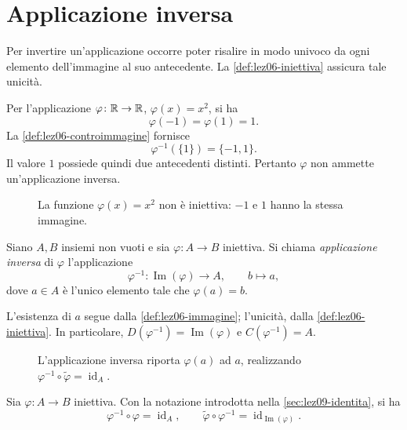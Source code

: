 \section{Applicazione inversa}
\label{sec:lez09-inversa}

Per invertire un'applicazione occorre poter risalire
in modo univoco da ogni elemento dell'immagine al suo
antecedente. La \cref{def:lez06-iniettiva} assicura tale unicità.

\begin{example}
\label{ex:lez09-non-iniettiva-inversa}
Per l'applicazione
\(\varphi\colon\mathbb{R}\to\mathbb{R}\), \(\varphi(x)=x^2\), si ha
\[
  \varphi(-1)=\varphi(1)=1.
\]
La \cref{def:lez06-controimmagine} fornisce
\[
  \varphi^{-1}(\{1\})=\{-1,1\}.
\]
Il valore \(1\) possiede quindi due antecedenti distinti.
Pertanto \(\varphi\) non ammette un'applicazione inversa.
\end{example}

\begin{figure}[htbp]
  \centering
  
  \caption{La funzione \(\varphi(x)=x^2\) non è iniettiva:
  \(-1\) e \(1\) hanno la stessa immagine.}
  \label{fig:lez09-inversa-non-iniettiva}
\end{figure}

\begin{definition}
\label{def:lez09-inversa}
Siano \(A,B\) insiemi non vuoti e sia
\(\varphi\colon A\longrightarrow B\) iniettiva.
Si chiama \emph{applicazione inversa} di \(\varphi\)
l'applicazione
\[
  \varphi^{-1}\colon\operatorname{Im}(\varphi)
  \longrightarrow A,
  \qquad b\longmapsto a,
\]
dove \(a\in A\) è l'unico elemento tale che
\(\varphi(a)=b\).
\end{definition}

L'esistenza di \(a\) segue dalla
\cref{def:lez06-immagine}; l'unicità, dalla
\cref{def:lez06-iniettiva}. In particolare,
\(D(\varphi^{-1})=\operatorname{Im}(\varphi)\) e
\(C(\varphi^{-1})=A\).

\begin{figure}[H]
  \centering
  
  \caption{L'applicazione inversa riporta
  \(\varphi(a)\) ad \(a\), realizzando
  \(\varphi^{-1}\circ\widetilde{\varphi}
  =\operatorname{id}_A\).}
  \label{fig:lez09-composizione-inversa}
\end{figure}

\begin{proposition}
\label{prop:lez09-inversa-composizione}
Sia \(\varphi\colon A\longrightarrow B\) iniettiva.
Con la notazione introdotta nella \cref{sec:lez09-identita},
si ha
\[
  \varphi^{-1}\circ\varphi=\operatorname{id}_A,
  \qquad
  \widetilde{\varphi}\circ\varphi^{-1}
  =\operatorname{id}_{\operatorname{Im}(\varphi)}.
\]
\end{proposition}

